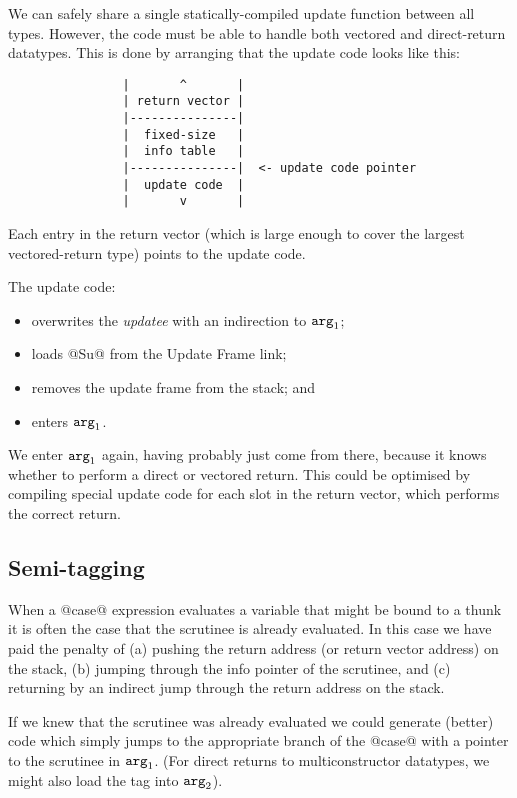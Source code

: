 \documentclass[11pt]{article}
\newcommand{\Arg}[1]{\mbox{${\tt arg}_{#1}$}}
\newcommand{\Subsection}[2]{\subsection{#1}\label{sec:#2}}
\begin{document}
We can safely share a single statically-compiled update function
between all types.  However, the code must be able to handle both
vectored and direct-return datatypes.  This is done by arranging that
the update code looks like this:

\begin{verbatim}
                |       ^       |
                | return vector |
                |---------------|
                |  fixed-size   |
                |  info table   |
                |---------------|  <- update code pointer
                |  update code  |
                |       v       |
\end{verbatim}

Each entry in the return vector (which is large enough to cover the
largest vectored-return type) points to the update code.

The update code:
\begin{itemize}
\item overwrites the \emph{updatee} with an indirection to \Arg{1};
\item loads @Su@ from the Update Frame link;
\item removes the update frame from the stack; and 
\item enters \Arg{1}.
\end{itemize}

We enter \Arg{1} again, having probably just come from there, because
it knows whether to perform a direct or vectored return.  This could
be optimised by compiling special update code for each slot in the
return vector, which performs the correct return.

\Subsection{Semi-tagging}{semi-tagging}

When a @case@ expression evaluates a variable that might be bound
to a thunk it is often the case that the scrutinee is already evaluated.
In this case we have paid the penalty of (a) pushing the return address (or
return vector address) on the stack, (b) jumping through the info pointer
of the scrutinee, and (c) returning by an indirect jump through the
return address on the stack.

If we knew that the scrutinee was already evaluated we could generate
(better) code which simply jumps to the appropriate branch of the
@case@ with a pointer to the scrutinee in \Arg{1}.  (For direct
returns to multiconstructor datatypes, we might also load the tag into
\Arg{2}).
\end{document}

